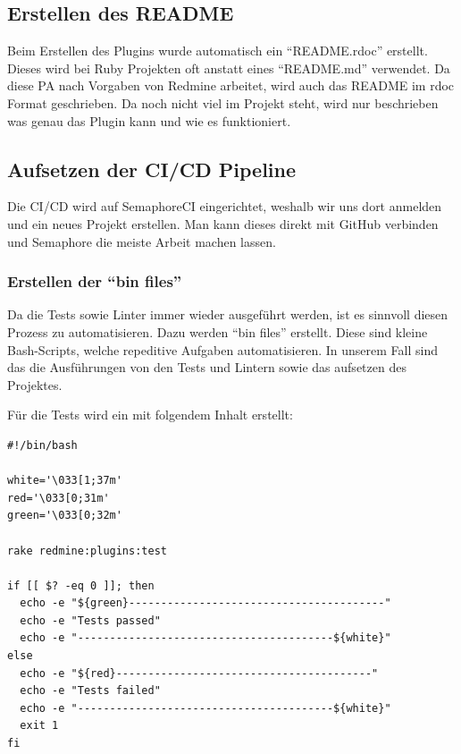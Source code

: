 \begin{minipage}{\textwidth}
  \subsection{Erstellen des README}
  Beim Erstellen des Plugins wurde automatisch ein \enquote{README.rdoc} erstellt. Dieses wird bei Ruby Projekten
  oft anstatt eines \enquote{README.md} verwendet. Da diese PA nach Vorgaben von Redmine arbeitet, wird auch das
  README im rdoc Format geschrieben. \newline
  Da noch nicht viel im Projekt steht, wird nur beschrieben was genau das Plugin kann und wie es funktioniert. \newline
\end{minipage}

\subsection{Aufsetzen der CI/CD Pipeline}
Die CI/CD wird auf SemaphoreCI eingerichtet, weshalb wir uns dort anmelden und ein neues Projekt erstellen. Man kann dieses
direkt mit GitHub verbinden und Semaphore die meiste Arbeit machen lassen.

\subsubsection{Erstellen der \enquote{bin files}}
Da die Tests sowie Linter immer wieder ausgeführt werden, ist es sinnvoll diesen Prozess zu automatisieren. Dazu werden 
\enquote{bin files} erstellt. Diese sind kleine Bash-Scripts, welche repeditive Aufgaben automatisieren. In unserem Fall sind
das die Ausführungen von den Tests und Lintern sowie das aufsetzen des Projektes. \newline

\begin{minipage}{\textwidth}
  Für die Tests wird ein  mit folgendem Inhalt erstellt:
  \begin{codebox}[]
    \begin{verbatim}
#!/bin/bash

white='\033[1;37m'
red='\033[0;31m'
green='\033[0;32m'

rake redmine:plugins:test

if [[ $? -eq 0 ]]; then
  echo -e "${green}----------------------------------------"
  echo -e "Tests passed"
  echo -e "----------------------------------------${white}"
else
  echo -e "${red}----------------------------------------"
  echo -e "Tests failed"
  echo -e "----------------------------------------${white}"
  exit 1
fi
    \end{verbatim}
  \end{codebox}
\end{minipage}

